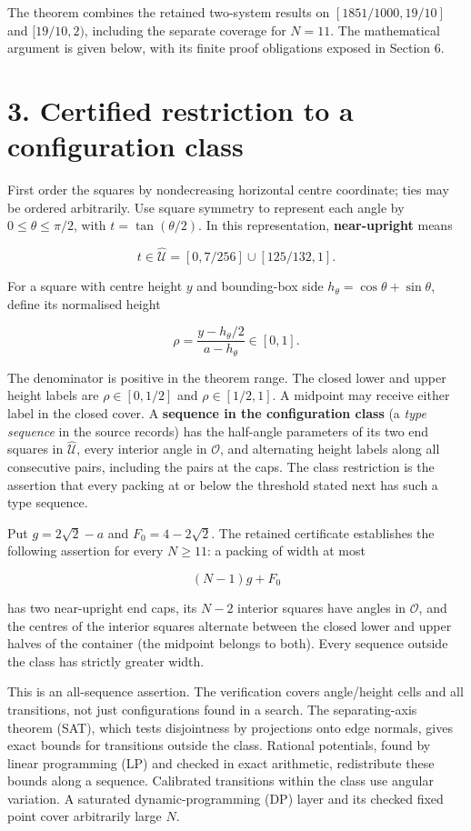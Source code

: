 \documentclass[
  11pt,
  a4paper,
]{article}
\begin{document}
The theorem combines the retained two-system results on
\([1851/1000,19/10]\) and \([19/10,2)\), including the separate coverage
for \(N=11\). The mathematical argument is given below, with its finite
proof obligations exposed in Section 6.

\section{3. Certified restriction to a configuration
class}\label{certified-restriction-to-a-configuration-class}

First order the squares by nondecreasing horizontal centre coordinate;
ties may be ordered arbitrarily. Use square symmetry to represent each
angle by \(0\le\theta\le\pi/2\), with \(t=\tan(\theta/2)\). In this
representation, \textbf{near-upright} means

\[
t\in\widehat{\mathcal U}=[0,7/256]\cup[125/132,1].
\]

For a square with centre height \(y\) and bounding-box side
\(h_\theta=\cos\theta+\sin\theta\), define its normalised height

\[
\rho=\frac{y-h_\theta/2}{a-h_\theta}\in[0,1].
\]

The denominator is positive in the theorem range. The closed lower and
upper height labels are \(\rho\in[0,1/2]\) and \(\rho\in[1/2,1]\). A
midpoint may receive either label in the closed cover. A
\textbf{sequence in the configuration class} (a \emph{type sequence} in
the source records) has the half-angle parameters of its two end squares
in \(\widehat{\mathcal U}\), every interior angle in \(\mathcal O\), and
alternating height labels along all consecutive pairs, including the
pairs at the caps. The class restriction is the assertion that every
packing at or below the threshold stated next has such a type sequence.

Put \(g=2\sqrt2-a\) and \(F_0=4-2\sqrt2\). The retained certificate
establishes the following assertion for every \(N\ge11\): a packing of
width at most

\[
(N-1)g+F_0
\]

has two near-upright end caps, its \(N-2\) interior squares have angles
in \(\mathcal O\), and the centres of the interior squares alternate
between the closed lower and upper halves of the container (the midpoint
belongs to both). Every sequence outside the class has strictly greater
width.

This is an all-sequence assertion. The verification covers angle/height
cells and all transitions, not just configurations found in a search.
The separating-axis theorem (SAT), which tests disjointness by
projections onto edge normals, gives exact bounds for transitions
outside the class. Rational potentials, found by linear programming (LP)
and checked in exact arithmetic, redistribute these bounds along a
sequence. Calibrated transitions within the class use angular variation.
A saturated dynamic-programming (DP) layer and its checked fixed point
cover arbitrarily large \(N\).
\end{document}
